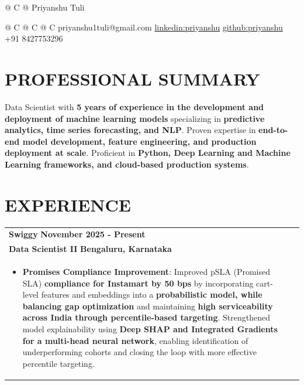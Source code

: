 \documentclass[a4paper,11pt]{article}
\begin{document}
\pagestyle{empty} 

\begin{tabularx}{\linewidth}{@{} C @{}}
\Huge{Priyanshu Tuli} \\[4pt]
\end{tabularx}

\begin{tabularx}{\linewidth}{@{} C @{} C @{} C}
{{\raisebox{-0.05\height}{\faEnvelope} 
priyanshu1tuli@gmail.com}} 
{{\href{https://www.linkedin.com/in/priyanshu-tuli/}{\raisebox{-0.05\height}{\faLinkedin} linkedin:priyanshu}}}
{{\href{https://github.com/Priyanshu0}
{\raisebox{-0.05\height}{\faGithubSquare} github:priyanshu}}}
{{\raisebox{-0.05\height}{\faMobile} +91 8427753296}} 
\end{tabularx}

\section{\textbf{PROFESSIONAL SUMMARY}}
\begin{minipage}{\linewidth}
Data Scientist with \textbf{ 5 years of experience in the development and deployment of machine learning models} specializing in \textbf{ predictive analytics, time series forecasting, and NLP}. Proven expertise in \textbf{end-to-end model development, feature engineering, and production deployment at scale}. Proficient in \textbf{Python, Deep Learning and Machine Learning frameworks, and cloud-based production systems}.
\end{minipage}
\section{\textbf{EXPERIENCE}}

\begin{tabularx}{\linewidth}{ @{}l r@{} }
\textbf{\Large{Swiggy}} \hfill \textbf{November 2025 - Present} \\[4pt]
\textbf{\Large{Data Scientist II}} \hfill \textbf{Bengaluru, Karnataka}\\[4pt]
\begin{minipage}[t]{\linewidth}
    \begin{itemize}[nosep,after=\strut, leftmargin=1em, itemsep=4pt]
    \item \textbf{Promises Compliance Improvement}: Improved pSLA (Promised SLA) \textbf{compliance for Instamart by 50 bps} by incorporating cart-level features and embeddings into a \textbf{probabilistic model, while balancing gap optimization} and maintaining \textbf{high serviceability across India through percentile-based targeting}. Strengthened model explainability using \textbf{Deep SHAP and Integrated Gradients for a multi-head neural network}, enabling identification of underperforming cohorts and closing the loop with more effective percentile targeting.
    \end{itemize}
\end{minipage}
\end{tabularx}
\end{document}
